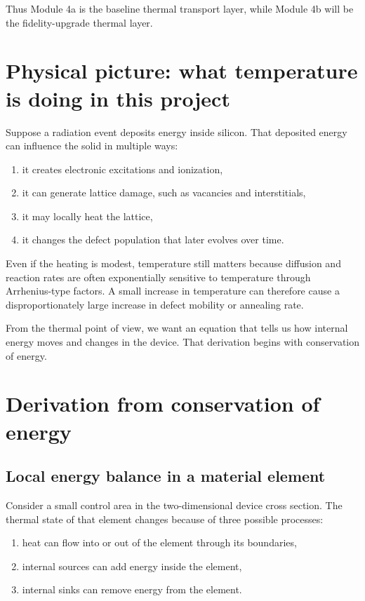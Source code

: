 \documentclass[11pt]{article}
\begin{document}
Thus Module 4a is the baseline thermal transport layer, while Module 4b will be the fidelity-upgrade thermal layer.

\section{Physical picture: what temperature is doing in this project}

Suppose a radiation event deposits energy inside silicon. That deposited energy can influence the solid in multiple ways:
\begin{enumerate}[label=\arabic*.]
    \item it creates electronic excitations and ionization,
    \item it can generate lattice damage, such as vacancies and interstitials,
    \item it may locally heat the lattice,
    \item it changes the defect population that later evolves over time.
\end{enumerate}

Even if the heating is modest, temperature still matters because diffusion and reaction rates are often exponentially sensitive to temperature through Arrhenius-type factors. A small increase in temperature can therefore cause a disproportionately large increase in defect mobility or annealing rate.

From the thermal point of view, we want an equation that tells us how internal energy moves and changes in the device. That derivation begins with conservation of energy.

\section{Derivation from conservation of energy}

\subsection{Local energy balance in a material element}

Consider a small control area in the two-dimensional device cross section. The thermal state of that element changes because of three possible processes:
\begin{enumerate}[label=\arabic*.]
    \item heat can flow into or out of the element through its boundaries,
    \item internal sources can add energy inside the element,
    \item internal sinks can remove energy from the element.
\end{enumerate}
\end{document}
